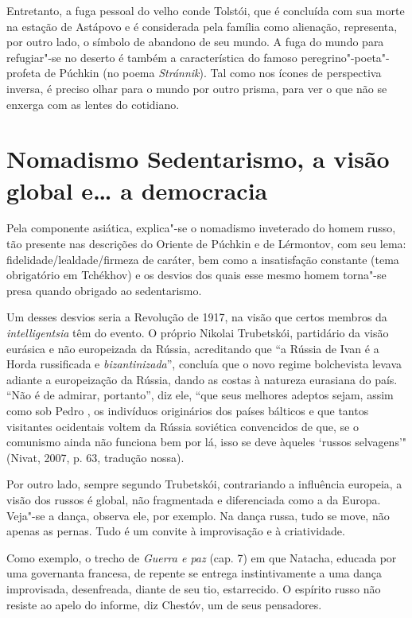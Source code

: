 Entretanto, a fuga pessoal do velho conde Tolstói, que é concluída com
sua morte na estação de Astápovo e é considerada pela família como
alienação, representa, por outro lado, o símbolo de abandono de seu
mundo. A fuga do mundo para refugiar"-se no deserto é também a
característica do famoso peregrino"-poeta"-profeta de Púchkin (no poema
\emph{Stránnik}). Tal como nos ícones de perspectiva inversa, é preciso
olhar para o mundo por outro prisma, para ver o que não se enxerga com
as lentes do cotidiano.

\section{Nomadismo  Sedentarismo, a visão global e\ldots{} a democracia}

Pela componente asiática, explica"-se o nomadismo inveterado do homem
russo, tão presente nas descrições do Oriente de Púchkin e de Lérmontov,
com seu lema: fidelidade/lealdade/firmeza de caráter, bem como a
insatisfação constante (tema obrigatório em Tchékhov) e os desvios dos
quais esse mesmo homem torna"-se presa quando obrigado ao sedentarismo.

Um desses desvios seria a Revolução de 1917, na visão que certos membros
da \emph{intelligentsia} têm do evento. O próprio Nikolai Trubetskói,
partidário da visão eurásica e não europeizada da Rússia, acreditando
que ``a Rússia de Ivan  é a Horda russificada e
\emph{bizantinizada}'', concluía que o novo regime bolchevista levava
adiante a europeização da Rússia, dando as costas à natureza eurasiana
do país. ``Não é de admirar, portanto'', diz ele, ``que seus melhores
adeptos sejam, assim como sob Pedro , os indivíduos originários dos
países bálticos e que tantos visitantes ocidentais voltem da Rússia
soviética convencidos de que, se o comunismo ainda não funciona bem por
lá, isso se deve àqueles `russos selvagens'" (Nivat, 2007, p. 63, tradução nossa).

Por outro lado, sempre segundo Trubetskói, contrariando a influência
europeia, a visão dos russos é global, não fragmentada e diferenciada
como a da Europa. Veja"-se a dança, observa ele, por exemplo. Na dança
russa, tudo se move, não apenas as pernas. Tudo é um convite à
improvisação e à criatividade.

Como exemplo, o trecho de \emph{Guerra e paz} (cap. 7) em que Natacha,
educada por uma governanta francesa, de repente se entrega
instintivamente a uma dança improvisada, desenfreada, diante de seu tio,
estarrecido. O espírito russo não resiste ao apelo do informe, diz
Chestóv, um de seus pensadores.


